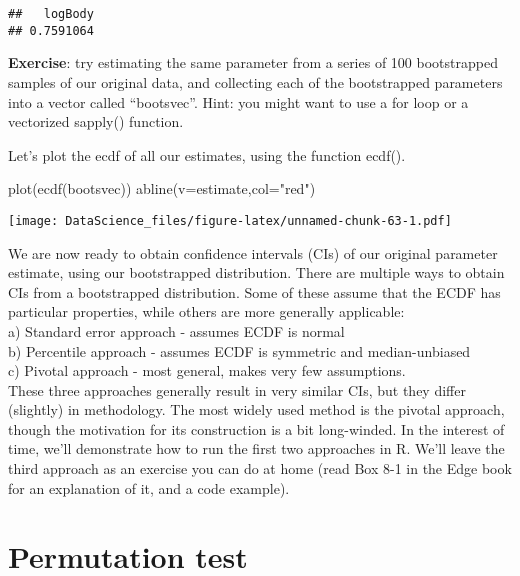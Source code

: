 \documentclass[
]{book}
\newenvironment{Shaded}{\begin{snugshade}}{\end{snugshade}}
\newcommand{\AttributeTok}[1]{\textcolor[rgb]{0.77,0.63,0.00}{#1}}
\newcommand{\FunctionTok}[1]{\textcolor[rgb]{0.00,0.00,0.00}{#1}}
\newcommand{\NormalTok}[1]{#1}
\newcommand{\StringTok}[1]{\textcolor[rgb]{0.31,0.60,0.02}{#1}}
\begin{document}
\begin{verbatim}
##   logBody 
## 0.7591064
\end{verbatim}

\textbf{Exercise}: try estimating the same parameter from a series of 100 bootstrapped samples of our original data, and collecting each of the bootstrapped parameters into a vector called ``bootsvec''. Hint: you might want to use a for loop or a vectorized sapply() function.

Let's plot the ecdf of all our estimates, using the function ecdf().

\begin{Shaded}
\begin{Highlighting}[]
\FunctionTok{plot}\NormalTok{(}\FunctionTok{ecdf}\NormalTok{(bootsvec))}
\FunctionTok{abline}\NormalTok{(}\AttributeTok{v=}\NormalTok{estimate,}\AttributeTok{col=}\StringTok{"red"}\NormalTok{)}
\end{Highlighting}
\end{Shaded}

\texttt{[image: DataScience\_files/figure-latex/unnamed-chunk-63-1.pdf]}

We are now ready to obtain confidence intervals (CIs) of our original parameter estimate, using our bootstrapped distribution. There are multiple ways to obtain CIs from a bootstrapped distribution. Some of these assume that the ECDF has particular properties, while others are more generally applicable:\\
a) Standard error approach - assumes ECDF is normal\\
b) Percentile approach - assumes ECDF is symmetric and median-unbiased\\
c) Pivotal approach - most general, makes very few assumptions.\\
These three approaches generally result in very similar CIs, but they differ (slightly) in methodology. The most widely used method is the pivotal approach, though the motivation for its construction is a bit long-winded. In the interest of time, we'll demonstrate how to run the first two approaches in R. We'll leave the third approach as an exercise you can do at home (read Box 8-1 in the Edge book for an explanation of it, and a code example).

\hypertarget{permutation-test}{%
\section{Permutation test}\label{permutation-test}}
\end{document}
